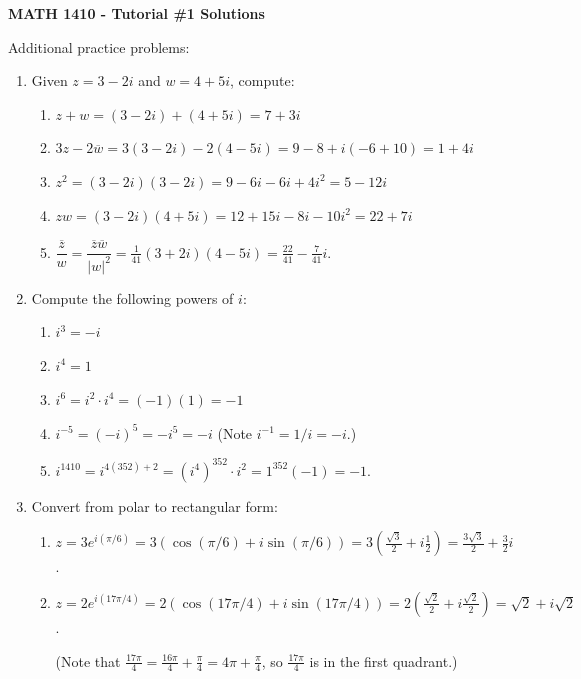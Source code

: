 \documentclass[12pt]{article}
\newcommand{\abs}[1]{\lvert #1\rvert}
\begin{document}
\author{Instructor: Sean Fitzpatrick}
\thispagestyle{empty}
\begin{center}

{\bf MATH 1410 - Tutorial \#1 Solutions}
\end{center}



Additional practice problems:
\begin{enumerate}
\item Given $z=3-2i$ and $w=4+5i$, compute:

\begin{enumerate}
\item $z+w = (3-2i)+(4+5i) = 7+3i$
\item $3z-2\overline{w} = 3(3-2i)-2(4-5i)=9-8+i(-6+10)=1+4i$
\item $z^2=(3-2i)(3-2i)=9-6i-6i+4i^2=5-12i$
\item $zw=(3-2i)(4+5i)=12+15i-8i-10i^2=22+7i$
\item $\dfrac{\overline{z}}{w} = \dfrac{\overline{z}\overline{w}}{\abs{w}^2} = \frac{1}{41}(3+2i)(4-5i)=\frac{22}{41}-\frac{7}{41}i.$
\end{enumerate}


\item Compute the following powers of $i$:
\begin{enumerate}
\item $i^3=-i$ \item $i^4=1$ \item $i^6=i^2\cdot i^4=(-1)(1)=-1$ \item $i^{-5} = (-i)^5 = -i^5=-i$ (Note $i^{-1}=1/i = -i$.) \item $i^{1410} = i^{4(352)+2}=(i^4)^{352}\cdot i^2 = 1^{352}(-1)=-1.$
\end{enumerate}

\item Convert from polar to rectangular form:

\begin{enumerate}
\item $z=3e^{i(\pi/6) } = 3(\cos(\pi/6)+i\sin(\pi/6)) = 3\left(\frac{\sqrt{3}}{2}+i\frac12\right)=\frac{3\sqrt{3}}{2}+\frac32 i$. 
\item $z= 2e^{i(17\pi/4) }=2(\cos(17\pi/4)+i\sin(17\pi/4))=2\left(\frac{\sqrt{2}}{2}+i\frac{\sqrt{2}}{2}\right)=\sqrt{2}+i\sqrt{2}$.

(Note that $\frac{17\pi}{4} = \frac{16\pi}{4}+\frac{\pi}{4} = 4\pi+\frac{\pi}{4}$, so $\frac{17\pi}{4}$ is in the first quadrant.)


\end{enumerate}
\end{enumerate}
\end{document}
